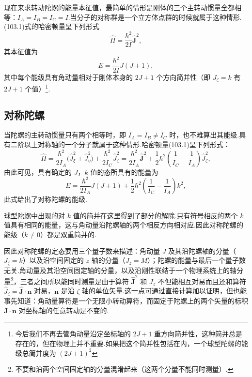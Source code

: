 现在来求转动陀螺的能量本征值，最简单的情形是刚体的三个主转动惯量全都相等：$I_A=I_B=I_C=I$.当分子的对称群是一个立方体点群的时候就属于这种情形.(103.1)式的哈密顿量呈下列形式
\begin{equation*}
  \hat{H}=\frac{\hbar^2}{2I}\hat{\boldsymbol{J}}^2,
\end{equation*}
其本征值为
\begin{equation}
  E=\frac{\hbar^2}{2I}J(J+1),
\end{equation}
其中每个能级具有角动量相对于刚体本身的 $2J+1$ 个方向简并性（即 $J_\zeta=k$ 有 $2J+1$ 个值）\footnote{今后我们不再去管角动量沿定坐标轴的 $2J+1$ 重方向简并性，这种简并总是存在的，但在物理上并不重要.如果把这个简并性包括在内，一个球型陀螺的能级总简并度为 $(2J+1)^2$}.

\subsection*{对称陀螺}

当陀螺的主转动惯量只有两个相等时，即 $I_A=I_B\neq I_C$ 时，也不难算出其能级.具有二阶以上对称轴的一个分子就属于这种情形.哈密顿量(103.1)呈下列形式：
\begin{equation}
  \hat{H}=\frac{\hbar^2}{2I_A}\big(\hat{J}_\xi^2+\hat{J}_\eta^2\big)
  +\frac{\hbar^2}{2I_C}\hat{J}_\zeta^2
  =\frac{\hbar^2}{2I_A}\hat{\boldsymbol{J}}^2
  +\frac{1}{2}\hbar^2\left(\frac{1}{I_C}-\frac{1}{I_A}\right)\hat{J}_\zeta^2,
\end{equation}
由此可见，具有确定的 $J$，$k$ 值的态所具有的能量为
\begin{equation}
  E=\frac{\hbar^2}{2I_A}J(J+1)
  +\frac{1}{2}\hbar^2\left(\frac{1}{I_C}-\frac{1}{I_A}\right)k^2,
\end{equation}
此式给出了对称陀螺的能级.

球型陀螺中出现的对 $k$ 值的简并在这里得到了部分的解除.只有符号相反的两个 $k$ 值具有相同的能量，这与角动量沿陀螺轴的两个相反方向相对应.因此对称陀螺的能级（$k\neq0$）都是双重简并的.

因此对称陀螺的定态要用三个量子数来描述：角动量 $J$ 及其沿陀螺轴的分量（$J_\zeta=k$）以及沿空间固定的 $z$ 轴的分量（$J_z=M$）；陀螺的能量与最后一个量子数无关.角动量及其沿空间固定轴的分量，以及沿刚性联结于一个物理系统上的轴分量\footnote{不要和沿两个空间固定轴的分量混淆起来（这两个分量不能同时测量）.}，三者之间所以能同时测量是由于算符 $\hat{\boldsymbol{J}}^2$ 和 $J_z$ 不但能相互对易而且还和算符 $\hat{J}_\zeta=\hat{\boldsymbol{J}}\cdot\boldsymbol{n}$ 对易，$\boldsymbol{n}$ 是沿 $\zeta$ 轴的单位矢量.这一点可通过直接计算加以证明，但也能事先知道：角动量算符是一个无限小转动算符，而固定于陀螺上的两个矢量的标积 $\boldsymbol{J}\cdot\boldsymbol{n}$ 对坐标轴的任意转动是不变的.

